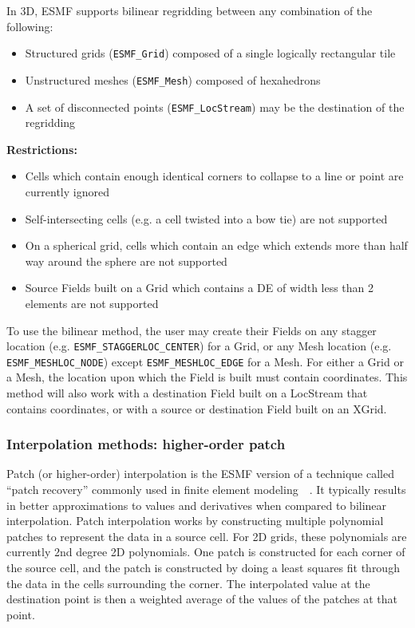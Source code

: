 \smallskip

 In 3D, ESMF supports bilinear regridding between any combination of the following:
 \begin{itemize}
 \item Structured grids ({\tt ESMF\_Grid}) composed of a single logically rectangular tile
 \item Unstructured meshes ({\tt ESMF\_Mesh}) composed of hexahedrons 
 \item A set of disconnected points ({\tt ESMF\_LocStream}) may be the destination of the regridding
 \end{itemize}

\smallskip

{\bf Restrictions:}
 \begin{itemize}
 \item Cells which contain enough identical corners to collapse to a line or point are currently ignored
 \item Self-intersecting cells (e.g. a cell twisted into a bow tie) are not supported 
 \item On a spherical grid, cells which contain an edge which extends more than half way around the sphere are not supported 
 \item Source Fields built on a Grid which contains a DE of width less than 2 elements are not supported
 \end{itemize}

 To use the bilinear method, the user may create their Fields on any stagger location (e.g. {\tt ESMF\_STAGGERLOC\_CENTER}) for a Grid, or
 any Mesh location (e.g. {\tt ESMF\_MESHLOC\_NODE}) except {\tt ESMF\_MESHLOC\_EDGE} for a Mesh. For either a Grid or a Mesh, the location upon which the Field is built 
 must contain coordinates. This method will also work with a destination Field built on a LocStream that contains coordinates, 
 or with a source or destination Field built on an XGrid.


\subsubsection{Interpolation methods: higher-order patch}\label{sec:interpolation:patch}

 Patch (or higher-order) interpolation is the ESMF version of a technique called ``patch recovery'' commonly
 used in finite element modeling~\cite{PatchInterp1}~\cite{PatchInterp2}. It typically results in better approximations to 
 values and derivatives when compared to bilinear interpolation.
 Patch interpolation works by constructing multiple polynomial patches to represent
 the data in a source cell. For 2D grids, these polynomials
 are currently 2nd degree 2D polynomials. One patch is constructed for each corner of the source cell, and the patch is constructed 
 by doing a least squares fit through the data in the cells surrounding the corner. The interpolated value at the destination point is 
 then a weighted average of the values of the patches at that point. 

